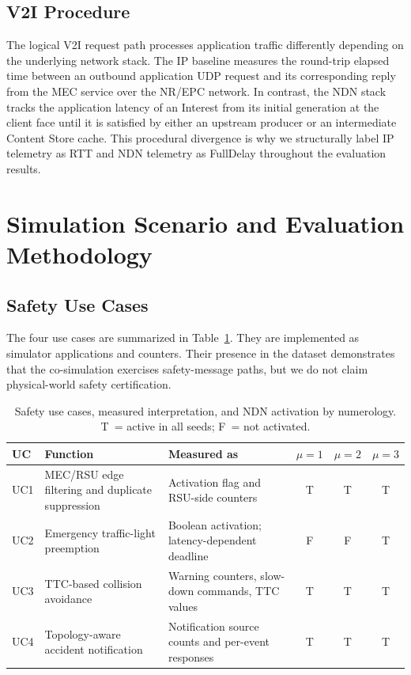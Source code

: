 \documentclass[journal]{IEEEtran}
\newcommand{\true}{\textsc{T}}
\newcommand{\false}{\textsc{F}}
\begin{document}
\subsection{V2I Procedure}

The logical V2I request path processes application traffic differently depending on the underlying network stack. The IP baseline measures the round-trip elapsed time between an outbound application UDP request and its corresponding reply from the MEC service over the NR/EPC network. In contrast, the NDN stack tracks the application latency of an Interest from its initial generation at the client face until it is satisfied by either an upstream producer or an intermediate Content Store cache. This procedural divergence is why we structurally label IP telemetry as RTT and NDN telemetry as FullDelay throughout the evaluation results.

\section{Simulation Scenario and Evaluation Methodology}
\label{sec:method}

\subsection{Safety Use Cases}

The four use cases are summarized in Table~\ref{tab:usecases}. They are implemented as simulator applications and counters. Their presence in the dataset demonstrates that the co-simulation exercises safety-message paths, but we do not claim physical-world safety certification.

\begin{table}[!t]\centering
\caption{Safety use cases, measured interpretation, and NDN activation by numerology. \true\ = active in all seeds; \false\ = not activated.}
\label{tab:usecases}
\footnotesize
\begin{tabular}{@{}p{}p{}p{}ccc@{}}
\toprule
UC & Function & Measured as & $\mu{=}1$ & $\mu{=}2$ & $\mu{=}3$\\
\midrule
UC1 & MEC/RSU edge filtering and duplicate suppression 
    & Activation flag and RSU-side counters 
    & \true & \true & \true\\
UC2 & Emergency traffic-light preemption 
    & Boolean activation; latency-dependent deadline 
    & \false & \false & \true\\
UC3 & TTC-based collision avoidance 
    & Warning counters, slow-down commands, TTC values 
    & \true & \true & \true\\
UC4 & Topology-aware accident notification 
    & Notification source counts and per-event responses 
    & \true & \true & \true\\
\bottomrule
\end{tabular}
\end{table}
\end{document}
